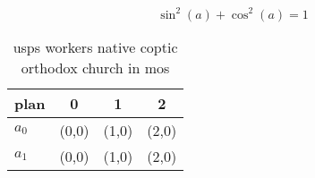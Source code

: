 \documentclass[a4paper]{article}
\begin{document}
\[ \sin^2(a)+\cos^2(a) = 1 \]

\begin{table}
\begin{adjustbox}{width=0.5\columnwidth}
\begin{tabular}{|l|l|l|l|}
\hline
\textbf{plan} & \multicolumn{1}{c|}{\textbf{0}} & \multicolumn{1}{c|}{\textbf{1}} & \multicolumn{1}{c|}{\textbf{2}} \\ \hline
\textbf{$a_0$}  & (0,0) & (1,0) & (2,0) \\ \hline
\textbf{$a_1$}  & (0,0) & (1,0) & (2,0) \\ \hline
\end{tabular}
\end{adjustbox}
\caption{usps workers native coptic orthodox church in mos
}
\end{table}
\end{document}
